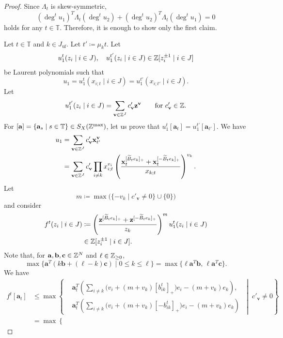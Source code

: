 \begin{proof}
Since $\Lambda_t$ is skew-symmetric,
\[
(\deg^t u_1)^T\Lambda_t(\deg^t u_2)
+ (\deg^t u_2)^T\Lambda_t(\deg^t u_1) = 0
\]
holds for any $t \in \mathbb{T}$.
Therefore, it is enough to show only the first claim.

Let $t \in \mathbb{T}$ and $k \in J_{\mathrm{uf}}$.
Let $t' \coloneq \mu_k t$.
Let
\[
u_1^t(z_i \mid i \in J),\quad
u_1^{t'}(z_i \mid i \in J)
\in \mathbb{Z}[z_i^{\pm 1} \mid i \in J]
\]
be Laurent polynomials such that
\[
u_1 = u_1^t(x_{i;t} \mid i \in J)
= u_1^{t'}(x_{i;t'} \mid i \in J).
\]
Let
\[
u_1^{t'}(z_i \mid i \in J)
= \sum_{\mathbf{v} \in \mathbb{Z}^J}c'_{\mathbf{v}}\mathbf{z}^{\mathbf{v}}
\qquad\text{for }c'_{\mathbf{v}} \in \mathbb{Z}.
\]
For
$[\mathbf{a}] = \{\mathbf{a}_s \mid s \in \mathbb{T}\}
\in S_X(\mathbb{Z}^{\max})$,
let us prove that $u_1^t[\mathbf{a}_t]
= u_1^{t'}[\mathbf{a}_{t'}]$.
We have
\[
\begin{aligned}
u_1
&= \sum_{\mathbf{v} \in \mathbb{Z}^J}c'_{\mathbf{v}}\mathbf{x}_{t'}^{\mathbf{v}} \\
&= \sum_{\mathbf{v} \in \mathbb{Z}^J}c'_{\mathbf{v}}
\prod_{i \neq k}x_{i;t}^{v_i}
\left(
\frac{\mathbf{x}_t^{[\widetilde{B}_t e_k]_+}
+ \mathbf{x}_t^{[-\widetilde{B}_t e_k]_+}}{x_{k;t}}
\right)^{v_k}.
\end{aligned}
\]
Let
\[
m \coloneq
\max\bigl(\{-v_k \mid c'_{\mathbf{v}} \neq 0\} \cup \{0\}\bigr)
\]
and consider
\[
\begin{aligned}
f^t(z_i \mid i \in J)
&\coloneq
\left(
\frac{\mathbf{z}^{[\widetilde{B}_t e_k]_+}
+ \mathbf{z}^{[-\widetilde{B}_t e_k]_+}}{z_k}
\right)^m u_1^t(z_i \mid i \in J) \\
&\in \mathbb{Z}[z_i^{\pm 1} \mid i \in J].
\end{aligned}
\]
Note that, for $\mathbf{a}, \mathbf{b}, \mathbf{c} \in \mathbb{Z}^N$ and $\ell \in \mathbb{Z}_{\geq 0}$,
\[
\max\{\mathbf{a}^T(k\mathbf{b} + (\ell-k)\mathbf{c}) \mid 0 \leq k \leq \ell\}
= \max\{\ell \mathbf{a}^T\mathbf{b},\, \ell \mathbf{a}^T\mathbf{c}\}.
\]
We have
\[
\begin{aligned}
f^t[\mathbf{a}_t]
&\leq \max\left\{
\begin{aligned}
&\mathbf{a}_t^T\left(
\sum_{i \neq k}\bigl(v_i+(m+v_k)[b_{ik}^t]_+\bigr)e_i
-(m+v_k)e_k\right), \\
&\mathbf{a}_t^T\left(
\sum_{i \neq k}\bigl(v_i+(m+v_k)[-b_{ik}^t]_+\bigr)e_i
-(m+v_k)e_k\right)
\end{aligned}
\;\middle|\; c'_{\mathbf{v}} \neq 0
\right\} \\
&= \max\left\{
\begin{aligned}

\end{aligned}
\end{aligned}\]
\end{proof}
